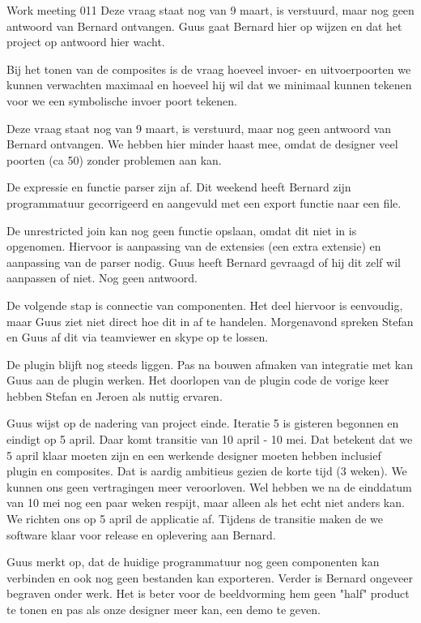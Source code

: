 \documentclass[a4paper,final]{article}
\begin{document}
\begin{Minutes}{Work meeting 011}
Deze vraag staat nog van 9 maart, is verstuurd, maar nog geen antwoord van Bernard ontvangen.
Guus gaat Bernard hier op wijzen en dat het project op antwoord hier wacht.

Bij het tonen van de composites is de vraag hoeveel invoer- en uitvoerpoorten
we kunnen verwachten maximaal en hoeveel hij wil dat we minimaal kunnen tekenen
voor we een symbolische invoer poort tekenen.

Deze vraag staat nog van 9 maart, is verstuurd, maar nog geen antwoord van Bernard ontvangen.
We hebben hier minder haast mee, omdat de designer veel poorten (ca 50) zonder problemen aan kan.

De expressie en functie parser zijn af. Dit weekend heeft Bernard zijn \vt programmatuur
gecorrigeerd en aangevuld met een export functie naar een \json file.

De unrestricted join kan nog geen functie opslaan, omdat dit niet in \xmas is opgenomen.
Hiervoor is aanpassing van de extensies (een extra extensie) en aanpassing van de parser
nodig. Guus heeft Bernard gevraagd of hij dit zelf wil aanpassen of niet. Nog geen antwoord.

De volgende stap is connectie van componenten. Het \xmas deel hiervoor is eenvoudig,
maar Guus ziet niet direct hoe dit in \qml af te handelen. Morgenavond spreken 
Stefan en Guus af dit via teamviewer en skype op te lossen.

De plugin blijft nog steeds liggen. Pas na bouwen afmaken van \xmas integratie met
\qml kan Guus aan de plugin werken. Het doorlopen van de plugin code de vorige keer
hebben Stefan en Jeroen als nuttig ervaren.

Guus wijst op de nadering van project einde. Iteratie 5 is gisteren begonnen en eindigt
op 5 april. Daar komt transitie van 10 april - 10 mei. Dat betekent dat we 5 april klaar 
moeten zijn en een werkende designer moeten hebben inclusief plugin en composites. Dat is
aardig ambitieus gezien de korte tijd (3 weken). We kunnen ons geen vertragingen meer veroorloven.
Wel hebben we na de einddatum van 10 mei nog een paar weken respijt, maar alleen als het
echt niet anders kan. We richten ons op 5 april de applicatie af. Tijdens de transitie 
maken de we software klaar voor release en oplevering aan Bernard.

Guus merkt op, dat de huidige programmatuur nog geen componenten kan verbinden en ook nog geen
bestanden kan exporteren. Verder is Bernard ongeveer begraven onder werk. Het is beter voor
de beeldvorming hem geen "half" product te tonen en pas als onze designer meer kan, een demo
te geven. 


\end{Minutes}
\end{document}
